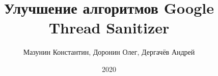 \title{Улучшение алгоритмов Google Thread Sanitizer}
\author{Мазунин Константин, Доронин Олег, Дергачёв Андрей}
\date{2020}

\maketitle

\clearpage